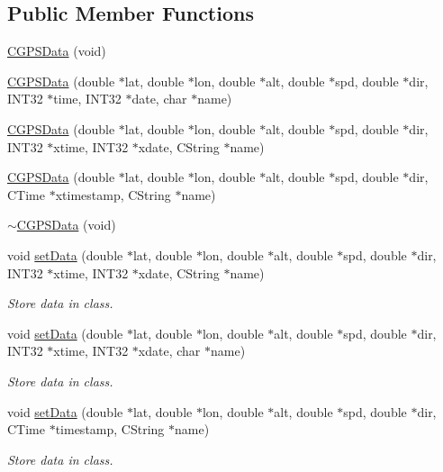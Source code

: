 \subsection*{Public Member Functions}
\begin{DoxyCompactItemize}
\item 
\hyperlink{classCGPSData_a869795eff4f38b2c04d061769eacd9f0}{CGPSData} (void)
\item 
\hyperlink{classCGPSData_ab5db4714507f97c4df02ca303c38999d}{CGPSData} (double $\ast$lat, double $\ast$lon, double $\ast$alt, double $\ast$spd, double $\ast$dir, INT32 $\ast$time, INT32 $\ast$date, char $\ast$name)
\item 
\hyperlink{classCGPSData_a74361e39f121cf96fc9cc35eccf4b490}{CGPSData} (double $\ast$lat, double $\ast$lon, double $\ast$alt, double $\ast$spd, double $\ast$dir, INT32 $\ast$xtime, INT32 $\ast$xdate, CString $\ast$name)
\item 
\hyperlink{classCGPSData_afd5615827ea13ed72a5231b9b2361ba2}{CGPSData} (double $\ast$lat, double $\ast$lon, double $\ast$alt, double $\ast$spd, double $\ast$dir, CTime $\ast$xtimestamp, CString $\ast$name)
\item 
\hyperlink{classCGPSData_af3a1549219c9ff5526b68458f0c82e23}{$\sim$CGPSData} (void)
\item 
void \hyperlink{classCGPSData_a7fdad98ca21ad7c6681413ff38d9352c}{setData} (double $\ast$lat, double $\ast$lon, double $\ast$alt, double $\ast$spd, double $\ast$dir, INT32 $\ast$xtime, INT32 $\ast$xdate, CString $\ast$name)
\begin{DoxyCompactList}\small\item\em Store data in class. \item\end{DoxyCompactList}\item 
void \hyperlink{classCGPSData_a19d2920213b594d6a689f547a6ed4f95}{setData} (double $\ast$lat, double $\ast$lon, double $\ast$alt, double $\ast$spd, double $\ast$dir, INT32 $\ast$xtime, INT32 $\ast$xdate, char $\ast$name)
\begin{DoxyCompactList}\small\item\em Store data in class. \item\end{DoxyCompactList}\item 
void \hyperlink{classCGPSData_af5972f0f81cedc5197d7abc61a5dd412}{setData} (double $\ast$lat, double $\ast$lon, double $\ast$alt, double $\ast$spd, double $\ast$dir, CTime $\ast$timestamp, CString $\ast$name)
\begin{DoxyCompactList}\small\item\em Store data in class. \item\end{DoxyCompactList}\item 

\end{DoxyCompactItemize}
